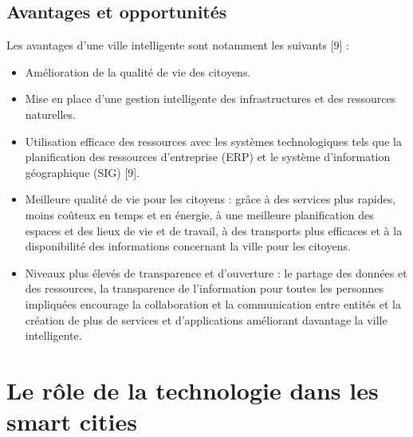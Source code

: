 \documentclass[french, a4paper, 12pt]{report}
\begin{document}
\subsection{Avantages et opportunités}
Les avantages d’une ville intelligente sont notamment les suivants [9] :
\begin{itemize}
\item \textbf{}Amélioration de la qualité de vie des citoyens.
\item \textbf{}Mise en place d’une gestion intelligente des infrastructures et des ressources naturelles.
\item \textbf{}Utilisation efficace des ressources avec les systèmes technologiques tels que la planification des ressources d'entreprise (ERP) et le système d'information géographique (SIG) [9].
\item \textbf{}Meilleure qualité de vie pour les citoyens : grâce à des services plus rapides, moins coûteux en temps et en énergie, à une meilleure planification des espaces et des lieux de vie et de travail, à des transports plus efficaces et à la disponibilité des informations concernant la ville pour les citoyens. 
\item \textbf{}Niveaux plus élevés de transparence et d’ouverture : le partage des données et des ressources, la transparence de l'information pour toutes les personnes impliquées encourage la collaboration et la communication entre entités et la création de plus de services et d'applications améliorant davantage la ville intelligente.
\end{itemize}
\section{Le rôle de la technologie dans les smart cities}
\end{document}
